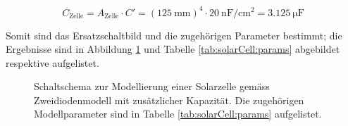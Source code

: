 \begin{equation}
    \label{eq:capa:jac}
    C_{\mathrm{Zelle}}
    = A_{\mathrm{Zelle}} \cdot C'
    = \left( \SI{125}{\milli\meter} \right)^4 \cdot \SI{20}{\nano\farad\per\centi\meter\squared}
    = \SI{3.125}{\micro\farad}
\end{equation}

Somit  sind das  Ersatzschaltbild  und die  zugeh\"origen Parameter  bestimmt;
die  Ergebnisse  sind  in Abbildung  \ref{fig:circuit:solarCell}  und  Tabelle
\ref{tab:solarCell:params} abgebildet respektive aufgelistet.

\begin{figure}[h!tb]
    \centering
    
    \caption[Zweidiodenmodell PV-Zelle mit zus\"atzlicher Kapazit\"at]{%
        Schaltschema    zur    Modellierung    einer    Solarzelle    gem\"ass
        Zweidiodenmodell  mit  zus\"atzlicher  Kapazit\"at. Die  zugeh\"origen
        Modellparameter    sind    in    Tabelle    \ref{tab:solarCell:params}
        aufgelistet.%
    }
    \label{fig:circuit:solarCell}
\end{figure}

